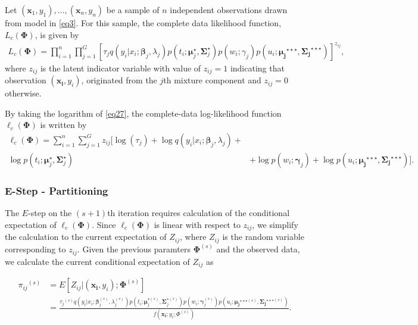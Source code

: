 \documentclass[11pt,letterpaper]{article}
\numberwithin{equation}{section}
\numberwithin{equation}{section}
\numberwithin{equation}{section}
\begin{document}
Let $(\bm x_1, y_1),\ldots, (\bm x_n, y_n)$ be a sample of $n$ independent observations drawn from model in \eqref{eq3}.
For this sample, the complete data likelihood function, $L_c(\bm\Phi)$, is given by
\begin{align}
L_c(\bm\Phi)=\prod_{i=1}^{n}\prod_{j=1}^{G}\left[{\tau_j}q(y_i|x_i; \bm \beta_j, \lambda_{j})p(t_i; \bm\mu_j^{\star}, \bm\Sigma_j^{\star}) p(w_i; \gamma_j)p(u_i; \bm{\mu_j}^{\star\star\star},\bm{\Sigma_j}^{\star\star\star}) \right]^{z_{ij}},
\label{eq27}
\end{align}
where $z_{ij}$ is the latent indicator variable with value of $z_{ij}=1$ indicating that observation $(\bm{x_i}, y_i)$, originated from the $j$th mixture component and $z_{ij}=0$ otherwise.

By taking the logarithm of \eqref{eq27}, the complete-data log-likelihood function $\ell_c(\bm\Phi)$ is written by
\begin{equation}\begin{split}
\ell_c(\bm\Phi)= \sum_{i=1}^{n}\sum_{j=1}^{G}{z_{ij}}\big[\log(\tau_{j}) + \log{q}(y_i|x_i; \bm \beta_j,\lambda_j)+& \\ \log p(t_i; \bm\mu_j^{\star}, \bm\Sigma_j^{\star}) & + \log p(w_i; \bm \gamma_j) +\log {p}(u_i; \bm{\mu_j}^{\star\star\star},\bm{\Sigma_j}^{\star\star\star}) \big].
\label{CompleteLiklihood}
\end{split}\end{equation}

\subsubsection{E-Step - Partitioning}
The $E$-step on the $(s+1)$th iteration requires calculation of the conditional expectation of $\ell_c(\bm\Phi)$. Since  $\ell_c(\bm\Phi)$ is linear with respect to  $z_{ij}$, we simplify the calculation to the current expectation of $Z_{ij}$, where $Z_{ij}$ is the random variable corresponding to $z_{ij}$. Given the previous paramters $\bm\Phi^{(s)}$ and the observed data,  we calculate the current conditional expectation of $Z_{ij}$ as

\begin{equation*}\begin{split}
    {\pi_{ij}}^{(s)} &= {E}[Z_{ij} |(\bm{x_i}, y_i); \bm{\Phi}^{(s)}]\\
     &= \frac{{\tau_j}^{(s)}q(y_i|x_i; \bm \beta_j^{(s)}, \lambda^{(s)}_{j})p(t_i; \bm\mu_j^{{\star}(s)}, \bm\Sigma_j^{{\star}(s)}) p(w_i; \bm \gamma_j^{(s)})p(u_i; \bm{\mu_j}^{\star\star\star (s)},\bm{\Sigma_j}^{\star\star\star (s)})}{f(\bm{x_i}; y_i; \Phi^{(s)})
\label{eq29}                       }.
\end{split}\end{equation*}
\end{document}
